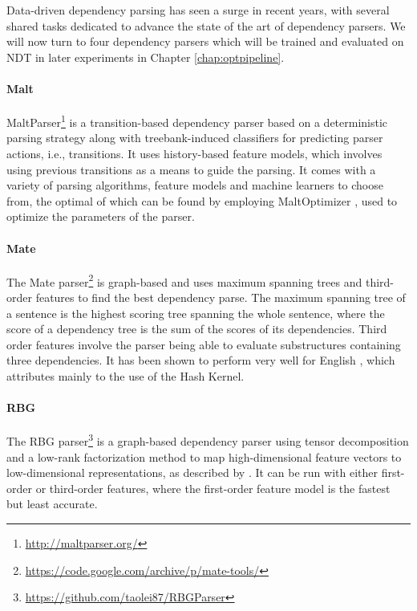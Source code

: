 \documentclass[a4paper,12pt,english]{book}
\begin{document}
Data-driven dependency parsing has seen a surge in recent years, with several
shared tasks dedicated to advance the state of the art of dependency parsers.
We will now turn to four dependency parsers which will be trained and evaluated
on NDT in later experiments in Chapter \ref{chap:optpipeline}.

\paragraph{Malt}
MaltParser\footnote{\url{http://maltparser.org/}} \cite{Niv:Hal:Nil:07} is a
transition-based dependency parser based on a deterministic parsing strategy
along with treebank-induced classifiers for predicting parser actions, i.e.,
transitions. It uses history-based feature models, which involves using
previous transitions as a means to guide the parsing. It comes with a variety
of parsing algorithms, feature models and machine learners to choose from, the
optimal of which can be found by employing MaltOptimizer \cite{Bal:Niv:12},
used to optimize the parameters of the parser.

\paragraph{Mate}
The Mate parser\footnote{\url{https://code.google.com/archive/p/mate-tools/}}
\cite{Boh:10} is graph-based and uses maximum spanning trees and third-order
features to find the best dependency parse. The maximum spanning tree of a
sentence is the highest scoring tree spanning the whole sentence, where the
score of a dependency tree is the sum of the scores of its dependencies. Third
order features involve the parser being able to evaluate substructures
containing three dependencies. It has been shown to perform very well for
English \cite{Cho:Tet:Ste:15}, which  attributes mainly to the
use of the Hash Kernel.

\paragraph{RBG}
The RBG parser\footnote{\url{https://github.com/taolei87/RBGParser}}
\cite{Lei:Xin:Zha:14} is a graph-based dependency parser using tensor
decomposition and a low-rank factorization method to map high-dimensional
feature vectors to low-dimensional representations, as described by
\cite{Lei:Xin:Zha:14}. It can be run with either first-order or third-order
features, where the first-order feature model is the fastest but least
accurate.
\end{document}
